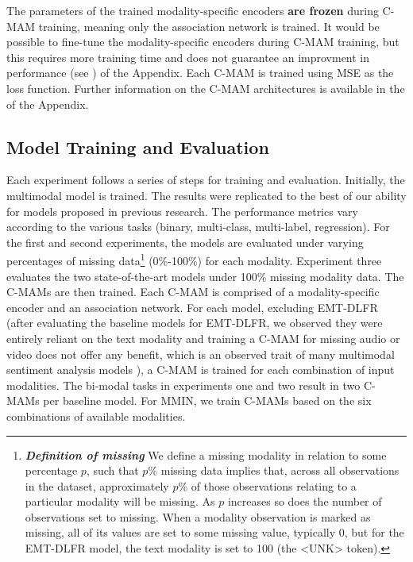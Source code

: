 The parameters of the trained modality-specific encoders \textbf{are frozen} during C-MAM training, meaning only the association network is trained. It would be possible to fine-tune the modality-specific encoders during C-MAM training, but this requires more training time and does not guarantee an improvment in performance (see ) of the Appendix. Each C-MAM is trained using MSE as the loss function. Further information on the C-MAM architectures is available in the  of the Appendix. 

\subsection{Model Training and Evaluation}

Each experiment follows a series of steps for training and evaluation. Initially, the multimodal model is trained. The results were replicated to the best of our ability for models proposed in previous research. The performance metrics vary according to the various tasks (binary, multi-class, multi-label, regression). For the first and second experiments, the models are evaluated under varying percentages of missing data\footnote{\textit{\textbf{Definition of missing}} We define a missing modality in relation to some percentage $p$, such that $p\%$ missing data implies that, across all observations in the dataset, approximately $p\%$ of those observations relating to a particular modality will be missing. As $p$ increases so does the number of observations set to missing. When a modality observation is marked as missing, all of its values are set to some missing value, typically 0, but for the EMT-DLFR model, the text modality is set to 100 (the <UNK> token). } (0\%-100\%) for each modality. Experiment three evaluates the two state-of-the-art models under 100\% missing modality data. The C-MAMs are then trained. Each C-MAM is comprised of a modality-specific encoder and an association network. For each model, excluding EMT-DLFR (after evaluating the baseline models for EMT-DLFR, we observed they were entirely reliant on the text modality and training a C-MAM for missing audio or video does not offer any benefit, which is an observed trait of many multimodal sentiment analysis models \cite{hazarika2022analyzing}), a C-MAM is trained for each combination of input modalities. The bi-modal tasks in experiments one and two result in two C-MAMs per baseline model. For MMIN, we train C-MAMs based on the six combinations of available modalities.
